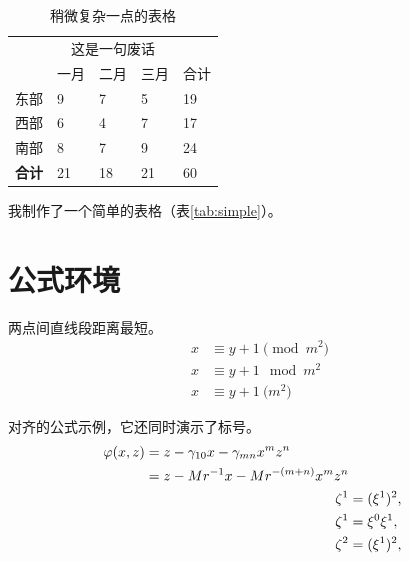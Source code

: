 \documentclass[
    bachelor, 
    ]{xjtuthesis}
\begin{document}
            \begin{table}[h!]
              \centering
              \caption{稍微复杂一点的表格}
              \label{tab:complex}
              \wuhao
              \begin{tabularx}{\linewidth}{XXXXX} \toprule 
                    & \multicolumn{3}{c}{这是一句废话} &  \\ \cmidrule{2-4}
                    & 一月 & 二月 & 三月 & 合计 \\ \midrule
               东部 &    9 &    7 &    5 &   19 \\ 
               西部 &    6 &    4 &    7 &   17 \\ 
               南部 &    8 &    7 &    9 &   24 \\ 
           \bf 合计 &   21 &   18 &   21 &   60 \\ \bottomrule
              \end{tabularx}
            \end{table}

            我制作了一个简单的表格（表\ref{tab:simple}）。


    \chapter{公式环境}

            \begin{axiom}
                \rm 两点间直线段距离最短。  
                \begin{align}
                    x&\equiv y+1\pmod{m^2}\\
                    x&\equiv y+1\mod{m^2}\\
                    x&\equiv y+1\pod{m^2}
                \end{align}
            \end{axiom}

            \begin{remark}
            \rm 对齐的公式示例，它还同时演示了标号。
            \begin{align}
            \begin{split} 
            \varphi(x,z)
            &=z-\gamma_{10}x-\gamma_{mn}x^mz^n\\
            &=z-Mr^{-1}x-Mr^{-(m+n)}x^mz^n
            \end{split} \notag \\
            \noindent\zeta^1&=(\xi^1)^2,\\
            \zeta^1 &=\xi^0\xi^1,\\
            \zeta^2 &=(\xi^1)^2,
            \end{align}
            \end{remark}
\end{document}
